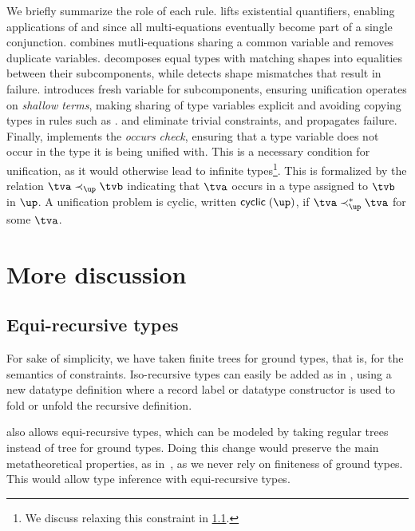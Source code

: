 \documentclass[acmsmall,screen,nonacm,review]{acmart}
\begin{document}

We briefly summarize the role of each rule.  lifts existential
quantifiers, enabling applications of  and  since
all multi-equations eventually become part of a single conjunction.
 combines mutli-equations sharing a common variable and
 removes duplicate variables.  decomposes equal
types with matching shapes into equalities between their subcomponents, while
 detects shape mismatches that result in failure. 
introduces fresh variable for subcomponents, ensuring unification operates on
\emph{shallow terms}, making sharing of type variables explicit and avoiding
copying types in rules such as .  and
 eliminate trivial constraints, and  propagates
failure.
%
Finally,  implements the \emph{occurs check}, ensuring that a
type variable does not occur in the type it is being unified with. This is a
necessary condition for unification, as it would otherwise lead to infinite
types\footnote{We discuss relaxing this constraint in \cref{sec/rec-types}.}.
This is formalized by the relation $\tv \prec_\up \tvb$ indicating that $\tv$
occurs in a type assigned to $\tvb$ in $\up$. A unification problem is cyclic,
written $\cyclic \up$, if $\tv \prec_\up^* \tv$ for some $\tv$.

\section{More discussion}

\subsection{Equi-recursive types}
\label {sec/rec-types}

For sake of simplicity, we have taken finite trees for ground types, that
is, for the semantics of constraints.  Iso-recursive types can easily be
added as in \ML, using a new datatype definition where  a record label
or datatype constructor is used to fold or unfold the recursive definition.

\OCaml also allows equi-recursive types, which can be modeled by taking
regular trees instead of tree for ground types.  Doing this change would
preserve the main metatheoretical properties, as in~\cite
{Pottier-Remy/emlti}, as we never rely on finiteness of ground types.  This
would allow type inference with equi-recursive types.
\end{document}
